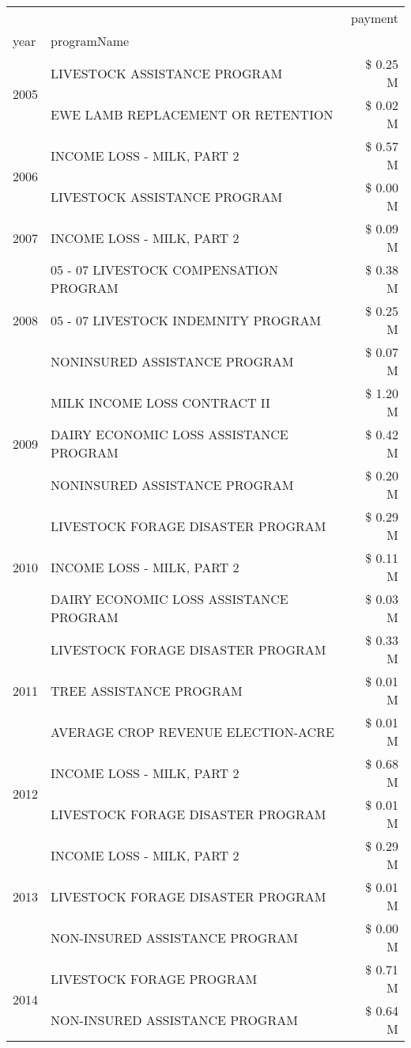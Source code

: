 \begin{tabular}{llr}
\toprule
 &  & payment \\
year & programName &  \\
\midrule
\multirow[t]{2}{*}{2005} & LIVESTOCK ASSISTANCE PROGRAM & \$ 0.25 M \\
 & EWE LAMB REPLACEMENT OR RETENTION & \$ 0.02 M \\
\cline{1-3}
\multirow[t]{2}{*}{2006} & INCOME LOSS - MILK, PART 2 & \$ 0.57 M \\
 & LIVESTOCK ASSISTANCE PROGRAM & \$ 0.00 M \\
\cline{1-3}
2007 & INCOME LOSS - MILK, PART 2 & \$ 0.09 M \\
\cline{1-3}
\multirow[t]{3}{*}{2008} & 05 - 07 LIVESTOCK COMPENSATION PROGRAM & \$ 0.38 M \\
 & 05 - 07 LIVESTOCK INDEMNITY PROGRAM & \$ 0.25 M \\
 & NONINSURED ASSISTANCE PROGRAM & \$ 0.07 M \\
\cline{1-3}
\multirow[t]{3}{*}{2009} & MILK INCOME LOSS CONTRACT II & \$ 1.20 M \\
 & DAIRY ECONOMIC LOSS ASSISTANCE PROGRAM & \$ 0.42 M \\
 & NONINSURED ASSISTANCE PROGRAM & \$ 0.20 M \\
\cline{1-3}
\multirow[t]{3}{*}{2010} & LIVESTOCK FORAGE DISASTER PROGRAM & \$ 0.29 M \\
 & INCOME LOSS - MILK, PART 2 & \$ 0.11 M \\
 & DAIRY ECONOMIC LOSS ASSISTANCE PROGRAM & \$ 0.03 M \\
\cline{1-3}
\multirow[t]{3}{*}{2011} & LIVESTOCK FORAGE DISASTER PROGRAM & \$ 0.33 M \\
 & TREE ASSISTANCE PROGRAM & \$ 0.01 M \\
 & AVERAGE CROP REVENUE ELECTION-ACRE & \$ 0.01 M \\
\cline{1-3}
\multirow[t]{2}{*}{2012} & INCOME LOSS - MILK, PART 2 & \$ 0.68 M \\
 & LIVESTOCK FORAGE DISASTER PROGRAM & \$ 0.01 M \\
\cline{1-3}
\multirow[t]{3}{*}{2013} & INCOME LOSS - MILK, PART 2 & \$ 0.29 M \\
 & LIVESTOCK FORAGE DISASTER PROGRAM & \$ 0.01 M \\
 & NON-INSURED ASSISTANCE PROGRAM & \$ 0.00 M \\
\cline{1-3}
\multirow[t]{3}{*}{2014} & LIVESTOCK FORAGE PROGRAM & \$ 0.71 M \\
 & NON-INSURED ASSISTANCE PROGRAM & \$ 0.64 M \\

\end{tabular}
